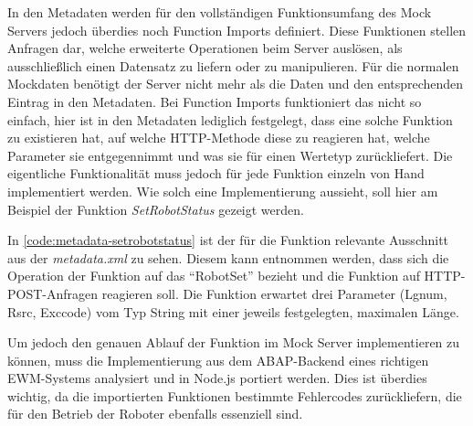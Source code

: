 In den Metadaten werden für den vollständigen Funktionsumfang des Mock Servers jedoch überdies noch Function Imports definiert.
Diese Funktionen stellen Anfragen dar, welche erweiterte Operationen beim Server auslösen, als ausschließlich einen Datensatz zu liefern oder zu manipulieren.
Für die normalen Mockdaten benötigt der Server nicht mehr als die Daten und den entsprechenden Eintrag in den Metadaten.
Bei Function Imports funktioniert das nicht so einfach, hier ist in den Metadaten lediglich festgelegt, dass eine solche Funktion zu existieren hat, auf welche \ac{HTTP}-Methode diese zu reagieren hat, welche Parameter sie entgegennimmt und was sie für einen Wertetyp zurückliefert.
Die eigentliche Funktionalität muss jedoch für jede Funktion einzeln von Hand implementiert werden.
Wie solch eine Implementierung aussieht, soll hier am Beispiel der Funktion \emph{SetRobotStatus} gezeigt werden.



In \autoref{code:metadata-setrobotstatus} ist der für die Funktion relevante Ausschnitt aus der \emph{metadata.xml} zu sehen.
Diesem kann entnommen werden, dass sich die Operation der Funktion auf das \enquote{RobotSet} bezieht und die Funktion auf \ac{HTTP}-POST-Anfragen reagieren soll.
Die Funktion erwartet drei Parameter (Lgnum, Rsrc, Exccode) vom Typ String mit einer jeweils festgelegten, maximalen Länge.

Um jedoch den genauen Ablauf der Funktion im Mock Server implementieren zu können, muss die Implementierung aus dem ABAP-Backend eines richtigen \ac{EWM}-Systems analysiert und in Node.js portiert werden.
Dies ist überdies wichtig, da die importierten Funktionen bestimmte Fehlercodes zurückliefern, die für den Betrieb der Roboter ebenfalls essenziell sind.

